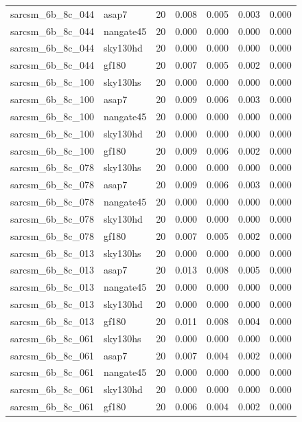 \begin{tabular}{llrrrrr}
sarcsm\_6b\_8c\_044 & asap7 & 20 & 0.008 & 0.005 & 0.003 & 0.000 \\
sarcsm\_6b\_8c\_044 & nangate45 & 20 & 0.000 & 0.000 & 0.000 & 0.000 \\
sarcsm\_6b\_8c\_044 & sky130hd & 20 & 0.000 & 0.000 & 0.000 & 0.000 \\
sarcsm\_6b\_8c\_044 & gf180 & 20 & 0.007 & 0.005 & 0.002 & 0.000 \\
sarcsm\_6b\_8c\_100 & sky130hs & 20 & 0.000 & 0.000 & 0.000 & 0.000 \\
sarcsm\_6b\_8c\_100 & asap7 & 20 & 0.009 & 0.006 & 0.003 & 0.000 \\
sarcsm\_6b\_8c\_100 & nangate45 & 20 & 0.000 & 0.000 & 0.000 & 0.000 \\
sarcsm\_6b\_8c\_100 & sky130hd & 20 & 0.000 & 0.000 & 0.000 & 0.000 \\
sarcsm\_6b\_8c\_100 & gf180 & 20 & 0.009 & 0.006 & 0.002 & 0.000 \\
sarcsm\_6b\_8c\_078 & sky130hs & 20 & 0.000 & 0.000 & 0.000 & 0.000 \\
sarcsm\_6b\_8c\_078 & asap7 & 20 & 0.009 & 0.006 & 0.003 & 0.000 \\
sarcsm\_6b\_8c\_078 & nangate45 & 20 & 0.000 & 0.000 & 0.000 & 0.000 \\
sarcsm\_6b\_8c\_078 & sky130hd & 20 & 0.000 & 0.000 & 0.000 & 0.000 \\
sarcsm\_6b\_8c\_078 & gf180 & 20 & 0.007 & 0.005 & 0.002 & 0.000 \\
sarcsm\_6b\_8c\_013 & sky130hs & 20 & 0.000 & 0.000 & 0.000 & 0.000 \\
sarcsm\_6b\_8c\_013 & asap7 & 20 & 0.013 & 0.008 & 0.005 & 0.000 \\
sarcsm\_6b\_8c\_013 & nangate45 & 20 & 0.000 & 0.000 & 0.000 & 0.000 \\
sarcsm\_6b\_8c\_013 & sky130hd & 20 & 0.000 & 0.000 & 0.000 & 0.000 \\
sarcsm\_6b\_8c\_013 & gf180 & 20 & 0.011 & 0.008 & 0.004 & 0.000 \\
sarcsm\_6b\_8c\_061 & sky130hs & 20 & 0.000 & 0.000 & 0.000 & 0.000 \\
sarcsm\_6b\_8c\_061 & asap7 & 20 & 0.007 & 0.004 & 0.002 & 0.000 \\
sarcsm\_6b\_8c\_061 & nangate45 & 20 & 0.000 & 0.000 & 0.000 & 0.000 \\
sarcsm\_6b\_8c\_061 & sky130hd & 20 & 0.000 & 0.000 & 0.000 & 0.000 \\
sarcsm\_6b\_8c\_061 & gf180 & 20 & 0.006 & 0.004 & 0.002 & 0.000 \\

\end{tabular}
